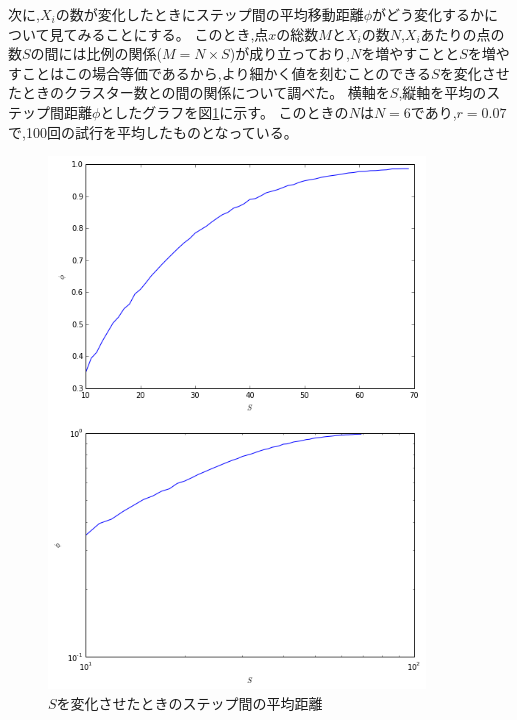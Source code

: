 次に,$X_{i}$の数が変化したときにステップ間の平均移動距離$\phi$がどう変化するかについて見てみることにする。
このとき,点$x$の総数$M$と$X_{i}$の数$N$,$X_{i}$あたりの点の数$S$の間には比例の関係($M=N\times S$)が成り立っており,$N$を増やすことと$S$を増やすことはこの場合等価であるから,より細かく値を刻むことのできる$S$を変化させたときのクラスター数との間の関係について調べた。
横軸を$S$,縦軸を平均のステップ間距離$\phi$としたグラフを図\ref{fig:f19}に示す。
このときの$N$は$N=6$であり,$r=0.07$で,100回の試行を平均したものとなっている。
\begin{figure}[H]
    \begin{center}
        \includegraphics[width=10cm]{../img/S_phi_1.png}
        \caption{$S$を変化させたときのステップ間の平均距離}
        \label{fig:f19}
    \end{center}
\end{figure}
